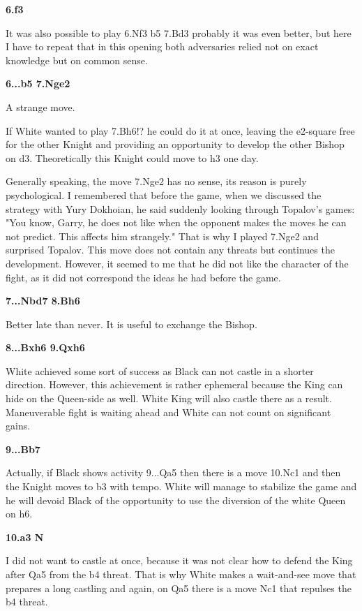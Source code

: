\documentclass[
	11pt,twocolumn]{article}
\renewcommand{\bf}{\bfseries}
\begin{document}
{\bf 6.f3 }

It was also possible to play 6.Nf3 b5 7.Bd3 probably it was even better, but here I have to repeat that in this opening both adversaries relied not on exact knowledge but on common sense. 

{\bf 6...b5 7.Nge2 }

A strange move.



If White wanted to play 7.Bh6!? he could do it at once, leaving the e2-square free for the other Knight and providing an opportunity to develop the other Bishop on d3. Theoretically this Knight could move to h3 one day. 



Generally speaking, the move 7.Nge2 has no sense, its reason is purely psychological. I remembered that before the game, when we discussed the strategy with Yury Dokhoian, he said suddenly looking through Topalov's games: "You know, Garry, he does not like when the opponent makes the moves he can not predict. This affects him strangely." That is why I played 7.Nge2 and surprised Topalov. This move does not contain any threats but continues the development. However, it seemed to me that he did not like the character of the fight, as it did not correspond the ideas he had before the game.

{\bf 7...Nbd7 8.Bh6 }

Better late than never. It is useful to exchange the Bishop.

{\bf 8...Bxh6 9.Qxh6 }

White achieved some sort of success as Black can not castle in a shorter direction. However, this achievement is rather ephemeral because the King can hide on the Queen-side as well. White King will also castle there as a result. Maneuverable fight is waiting ahead and White can not count on significant gains.

{\bf 9...Bb7 }

Actually, if Black shows activity 9...Qa5  then there is a move 10.Nc1 and then the Knight moves to b3 with tempo. White will manage to stabilize the game and he will devoid Black of the opportunity to use the diversion of the white Queen on h6. 

{\bf 10.a3 N }

I did not want to castle at once, because it was not clear how to defend the King after Qa5 from the b4 threat. That is why White makes a wait-and-see move that prepares a long castling and again, on Qa5 there is a move Nc1 that repulses the b4 threat.
\end{document}
